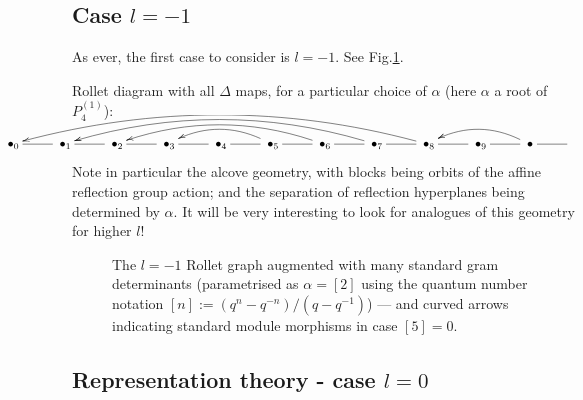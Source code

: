 \documentclass{article}
\newcommand{\ppm}[1]{\textcolor{red}{#1}}
\theoremstyle{definition}
\newcommand{\xx}{\alpha}       %
\def\a{\alpha}
\numberwithin{equation}{subsection}
\begin{document}
\subsection{Case $l=-1$}

As ever, the first case to consider is $l=-1$.  See Fig.\ref{fig:gramdets03}. 

\medskip 



Rollet diagram with all $\Delta$ maps, for a particular choice of $\xx$ 
(here $\xx$ a root of $P^{(1)}_4$):   %

\[
\hspace{-2.1cm} 
\xymatrix{
   \;\bullet_0 \ar@{-}[r] &  
   \;\bullet_1 \ar@{-}[r] &  
   \;\bullet_2 \ar@{-}[r] &  
   \;\bullet_3 \ar@{-}[r] &  
   \;\bullet_4 \ar@{-}[r] &  
   \;\bullet_5 \ar@{-}[r] \ar@[red]@/_1pc/[ll] &  
   \;\bullet_6 \ar@{-}[r] \ar@[red]@/_1.3pc/[llll] &  
   \;\bullet_7 \ar@{-}[r] \ar@[red]@/_1.653pc/[llllll] &  
   \;\bullet_8 \ar@{-}[r] \ar@[red]@/_1.9653pc/[llllllll] &  
   \;\bullet_9 \ar@{-}[r] &  
   \;\bullet_{} \ar@{-}[r] \ar@[red]@/_1pc/[ll] &  
   }
\]
Note in particular the alcove geometry, with blocks being orbits of the affine reflection group action; and the separation of reflection hyperplanes being determined by $\xx$.
It will be very interesting to look for analogues of this geometry for higher $l$! 
   

\begin{figure} 



\caption{The $l=-1$ Rollet graph augmented with many standard gram determinants (parametrised as $\a=[2]$ using the quantum number notation $[n]:=(q^n-q^{-n})/(q-q^{-1})$) --- 
and curved arrows indicating standard module morphisms in case $[5]=0$. 
\label{fig:gramdets03}}
\end{figure}


\newpage 



\subsection{Representation theory - case $l=0$}
\end{document}
